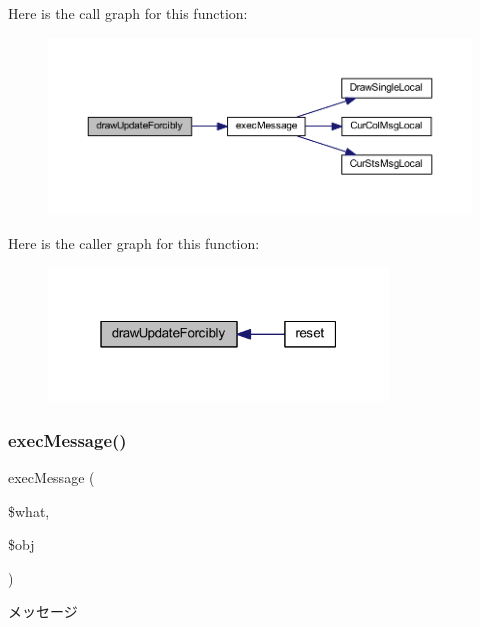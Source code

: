 Here is the call graph for this function\+:\nopagebreak
\begin{figure}[H]
\begin{center}
\leavevmode
\includegraphics[width=350pt]{class_reversi_play_a3ae28eb121caf59932218ea7d1fca81d_cgraph}
\end{center}
\end{figure}
Here is the caller graph for this function\+:\nopagebreak
\begin{figure}[H]
\begin{center}
\leavevmode
\includegraphics[width=256pt]{class_reversi_play_a3ae28eb121caf59932218ea7d1fca81d_icgraph}
\end{center}
\end{figure}
\mbox{\label{class_reversi_play_ae8beea2648c1c5cf722364e84a90edf9}} 
\subsubsection{\texorpdfstring{exec\+Message()}{execMessage()}}
{\footnotesize\ttfamily exec\+Message (\begin{DoxyParamCaption}\item[{}]{\$what,  }\item[{}]{\$obj }\end{DoxyParamCaption})\hspace{0.3cm}{\ttfamily [private]}}



メッセージ 



